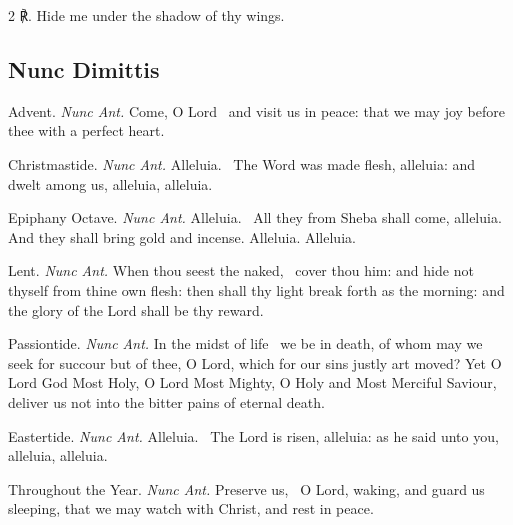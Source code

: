 \begin{multicols}{2}
℟. Hide me under the shadow of thy wings.

\subsection{Nunc Dimittis}
\par\noindent
{\color{RubricRed}Advent.} \textit{Nunc Ant.} Come, O Lord~{\dag} and visit us in peace: that we may joy before thee with a perfect heart.%
\par\noindent
{\color{RubricRed}Christmastide.} \textit{Nunc Ant.} Alleluia.~{\dag} The Word was made flesh, alleluia: and dwelt among us, alleluia, alleluia.%
\par\noindent
{\color{RubricRed}Epiphany Octave.} \textit{Nunc Ant.} Alleluia.~{\dag} All they from Sheba shall come, alleluia. And they shall bring gold and incense. Alleluia. Alleluia.%
\par\noindent
{\color{RubricRed}Lent.} \textit{Nunc Ant.} When thou seest the naked,~{\dag} cover thou him: and hide not thyself from thine own flesh: then shall thy light break forth as the morning: and the glory of the Lord shall be thy reward.%
\par\noindent
{\color{RubricRed}Passiontide.} \textit{Nunc Ant.} In the midst of life~{\dag} we be in death, of whom may we seek for succour but of thee, O Lord, which for our sins justly art moved? Yet O Lord God Most Holy, O Lord Most Mighty, O Holy and Most Merciful Saviour, deliver us not into the bitter pains of eternal death. %
\par\noindent
{\color{RubricRed}Eastertide.} \textit{Nunc Ant.} Alleluia.~{\dag} The Lord is risen, alleluia: as he said unto you, alleluia, alleluia.
\par\noindent
{\color{RubricRed}Throughout the Year.} \textit{Nunc Ant.} Preserve us,~{\dag} O Lord, waking, and guard us sleeping, that we may watch with Christ, and rest in peace.\\


\end{multicols}
